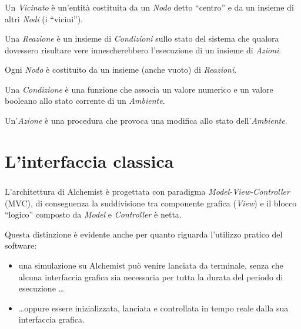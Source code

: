 \documentclass[%
]{beamer}
\newcommand{\engEmph}[1] {\emph{\foreignlanguage{english}#1}}
\begin{document}
    \begin{frame}
        \frametitle{\insertsection}
        \framesubtitle{\insertsubsection}

        \begin{description}[<+->]
            \item[Vicinato]\label{itm:neigh}
                Un \emph{Vicinato} è un'entità costituita da un \emph{Nodo} detto ``centro'' e da un insieme di altri \emph{Nodi} (i ``vicini'').

            \item[Reazione]\label{itm:react}
                Una \emph{Reazione} è un insieme di \emph{Condizioni} sullo stato del sistema che qualora dovessero risultare vere innescherebbero l'esecuzione di un insieme di \emph{Azioni}.

                Ogni \emph{Nodo} è costituito da un insieme (anche vuoto) di \emph{Reazioni}.

            \item[Condizione]\label{itm:cond}
                Una \emph{Condizione} è una funzione che associa un valore numerico e un valore booleano allo stato corrente di un \emph{Ambiente}.

            \item[Azione]\label{itm:act}
                Un'\emph{Azione} è una procedura che provoca una modifica allo stato dell'\emph{Ambiente}.
        \end{description}
    \end{frame}

    \section{L'interfaccia classica}\label{sec:old}
    \begin{frame}
        \frametitle{\insertsection}
        L'architettura di Alchemist è progettata con paradigma \engEmph{Model-View-Controller} (MVC), di conseguenza la suddivisione tra componente grafica (\engEmph{View}) e il blocco ``logico'' composto da \engEmph{Model} e \engEmph{Controller} è netta.

        \medskip
        \pause

        Questa distinzione è evidente anche per quanto riguarda l'utilizzo pratico del software:

        \begin{itemize}[<+(1)->]
          \item
              una simulazione su Alchemist può venire lanciata da terminale, senza che alcuna interfaccia grafica sia necessaria per tutta la durata del periodo di esecuzione \ldots

          \item
              \ldots oppure essere inizializzata, lanciata e controllata in tempo reale dalla sua interfaccia grafica.
        \end{itemize}
    \end{frame}
\end{document}
